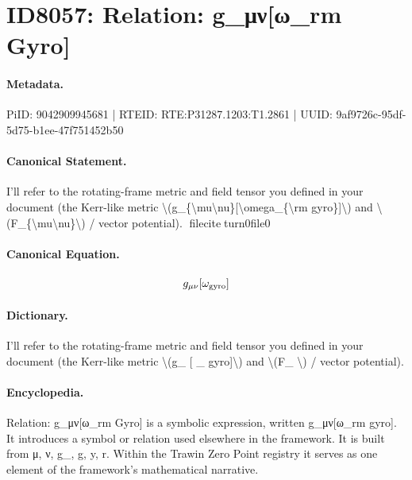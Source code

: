 \section*{ID8057: Relation: g\_μν[ω\_rm Gyro]}
\paragraph{Metadata.}
PiID: 9042909945681 | RTEID: RTE:P31287.1203:T1.2861 | UUID: 9af9726c-95df-5d75-b1ee-47f751452b50

\paragraph{Canonical Statement.}
I’ll refer to the rotating-frame metric and field tensor you defined in your document (the Kerr-like metric \textbackslash{}(g\_\{\textbackslash{}mu\textbackslash{}nu\}[\textbackslash{}omega\_\{\textbackslash{}rm gyro\}]\textbackslash{}) and \textbackslash{}(F\_\{\textbackslash{}mu\textbackslash{}nu\}\textbackslash{}) / vector potential). fileciteturn0file0

\paragraph{Canonical Equation.}
\[
g_{\mu\nu}[\omega_{\rm gyro}]
\]

\paragraph{Dictionary.}
I’ll refer to the rotating-frame metric and field tensor you defined in your document (the Kerr-like metric \textbackslash{}(g\_ [ \_ gyro]\textbackslash{}) and \textbackslash{}(F\_ \textbackslash{}) / vector potential).

\paragraph{Encyclopedia.}
Relation: g\_μν[ω\_rm Gyro] is a symbolic expression, written g\_μν[ω\_rm gyro]. It introduces a symbol or relation used elsewhere in the framework. It is built from μ, ν, g\_, g, y, r. Within the Trawin Zero Point registry it serves as one element of the framework's mathematical narrative.
